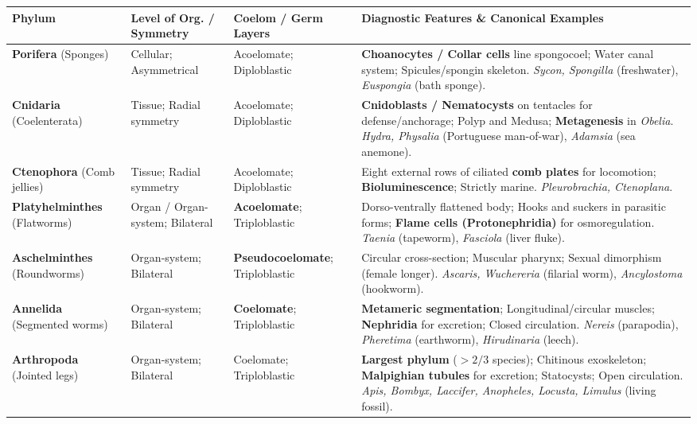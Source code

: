 \documentclass[10pt,a4paper]{article}
\begin{document}
\begin{conceptbox}
\begin{center}
\scriptsize
\begin{tabular}{|p{2.3cm}|p{2.3cm}|p{2.6cm}|p{7.0cm}|}
\hline
\textbf{Phylum} & \textbf{Level of Org. / Symmetry} & \textbf{Coelom / Germ Layers} & \textbf{Diagnostic Features \& Canonical Examples} \\
\hline
\textbf{Porifera} (Sponges) & Cellular; Asymmetrical & Acoelomate; Diploblastic & \textbf{Choanocytes / Collar cells} line spongocoel; Water canal system; Spicules/spongin skeleton. \textit{Sycon, Spongilla} (freshwater), \textit{Euspongia} (bath sponge). \\
\hline
\textbf{Cnidaria} (Coelenterata) & Tissue; Radial symmetry & Acoelomate; Diploblastic & \textbf{Cnidoblasts / Nematocysts} on tentacles for defense/anchorage; Polyp and Medusa; \textbf{Metagenesis} in \textit{Obelia}. \textit{Hydra, Physalia} (Portuguese man-of-war), \textit{Adamsia} (sea anemone). \\
\hline
\textbf{Ctenophora} (Comb jellies) & Tissue; Radial symmetry & Acoelomate; Diploblastic & Eight external rows of ciliated \textbf{comb plates} for locomotion; \textbf{Bioluminescence}; Strictly marine. \textit{Pleurobrachia, Ctenoplana}. \\
\hline
\textbf{Platyhelminthes} (Flatworms) & Organ / Organ-system; Bilateral & \textbf{Acoelomate}; Triploblastic & Dorso-ventrally flattened body; Hooks and suckers in parasitic forms; \textbf{Flame cells (Protonephridia)} for osmoregulation. \textit{Taenia} (tapeworm), \textit{Fasciola} (liver fluke). \\
\hline
\textbf{Aschelminthes} (Roundworms) & Organ-system; Bilateral & \textbf{Pseudocoelomate}; Triploblastic & Circular cross-section; Muscular pharynx; Sexual dimorphism (female longer). \textit{Ascaris, Wuchereria} (filarial worm), \textit{Ancylostoma} (hookworm). \\
\hline
\textbf{Annelida} (Segmented worms) & Organ-system; Bilateral & \textbf{Coelomate}; Triploblastic & \textbf{Metameric segmentation}; Longitudinal/circular muscles; \textbf{Nephridia} for excretion; Closed circulation. \textit{Nereis} (parapodia), \textit{Pheretima} (earthworm), \textit{Hirudinaria} (leech). \\
\hline
\textbf{Arthropoda} (Jointed legs) & Organ-system; Bilateral & Coelomate; Triploblastic & \textbf{Largest phylum} ($>2/3$ species); Chitinous exoskeleton; \textbf{Malpighian tubules} for excretion; Statocysts; Open circulation. \textit{Apis, Bombyx, Laccifer, Anopheles, Locusta, Limulus} (living fossil). \\

\end{tabular}
\end{center}
\end{conceptbox}
\end{document}
